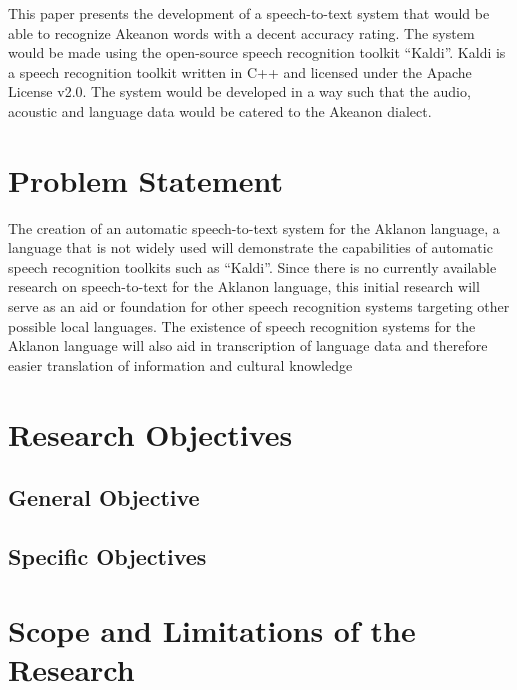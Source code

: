This paper presents the development of a speech-to-text system that would be able to recognize Akeanon words with a decent accuracy rating. The system would be made using the open-source speech recognition toolkit “Kaldi”. Kaldi is a speech recognition toolkit written in C++ and licensed under the Apache License v2.0. The system would be developed in a way such that the audio, acoustic and language data would be catered to the Akeanon dialect.


\section{Problem Statement}

The creation of an automatic speech-to-text system for the Aklanon language, a language that is not widely used will demonstrate the capabilities of automatic speech recognition toolkits such as “Kaldi”.  Since there is no currently available research on speech-to-text for the Aklanon language, this initial research will serve as an aid or foundation for other speech recognition systems targeting other possible local languages. The existence of speech recognition systems for the Aklanon language will also aid in transcription of language data and therefore easier translation of information and cultural knowledge

\section{Research Objectives}


\subsection{General Objective}



\subsection{Specific Objectives}



\section{Scope and Limitations of the Research}



